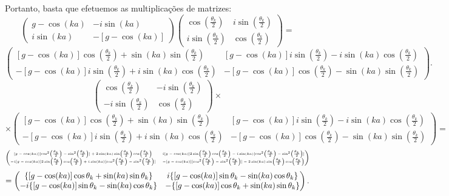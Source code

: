 \documentclass[a4paper,10pt]{article}
\begin{document}
Portanto, basta que efetuemos as multiplicações de matrizes:
$$
\begin{pmatrix}
g-\cos(ka) & -i\sin(ka) \\
i\sin(ka) & -[g-\cos(ka)]
\end{pmatrix}
\begin{pmatrix}
\cos(\frac{\theta_k}{2}) & i \sin(\frac{\theta_k}{2}) \\
i \sin(\frac{\theta_k}{2}) & \cos(\frac{\theta_k}{2})
\end{pmatrix}
=
$$
$$
\begin{pmatrix}
[g-\cos(ka)] \cos(\frac{\theta_k}{2}) + \sin(ka) \sin(\frac{\theta_k}{2}) &
[g-\cos(ka)] i \sin(\frac{\theta_k}{2}) - i \sin(ka) \cos(\frac{\theta_k}{2}) \\
-[g-\cos(ka)] i \sin(\frac{\theta_k}{2}) + i \sin(ka) \cos(\frac{\theta_k}{2}) &
-[g-\cos(ka)] \cos(\frac{\theta_k}{2}) - \sin(ka) \sin(\frac{\theta_k}{2})
\end{pmatrix}.
$$
$$
\begin{pmatrix}
\cos(\frac{\theta_k}{2}) & -i \sin(\frac{\theta_k}{2}) \\
-i \sin(\frac{\theta_k}{2}) & \cos(\frac{\theta_k}{2})
\end{pmatrix}
\times
$$
$$
\times
\begin{pmatrix}
[g-\cos(ka)] \cos(\frac{\theta_k}{2}) + \sin(ka) \sin(\frac{\theta_k}{2}) &
[g-\cos(ka)] i \sin(\frac{\theta_k}{2}) - i \sin(ka) \cos(\frac{\theta_k}{2}) \\
-[g-\cos(ka)] i \sin(\frac{\theta_k}{2}) + i \sin(ka) \cos(\frac{\theta_k}{2}) &
-[g-\cos(ka)] \cos(\frac{\theta_k}{2}) - \sin(ka) \sin(\frac{\theta_k}{2})
\end{pmatrix} =
$$
$$
\tiny{
\begin{pmatrix}
[g-\cos(ka)] [\cos[2](\frac{\theta_k}{2}) - \sin[2](\frac{\theta_k}{2})] +
2 \sin(ka) \sin(\frac{\theta_k}{2}) \cos(\frac{\theta_k}{2}) &
i [g-\cos(ka)] 2 \sin(\frac{\theta_k}{2}) \cos(\frac{\theta_k}{2}) - i \sin(ka) [\cos[2](\frac{\theta_k}{2}) - \sin[2](\frac{\theta_k}{2})] \\
- i [g-\cos(ka)] 2 \sin(\frac{\theta_k}{2}) \cos(\frac{\theta_k}{2}) + i \sin(ka) [\cos[2](\frac{\theta_k}{2}) - \sin[2](\frac{\theta_k}{2})] &
- [g-\cos(ka)] [\cos[2](\frac{\theta_k}{2}) - \sin[2](\frac{\theta_k}{2})] -
2 \sin(ka) \sin(\frac{\theta_k}{2}) \cos(\frac{\theta_k}{2})
\end{pmatrix} }
$$
$$
=
\begin{pmatrix}
\qty{[g-\cos(ka)] \cos\theta_k + \sin(ka) \sin\theta_k } &
 i \qty{[g-\cos(ka)] \sin\theta_k - \sin(ka) \cos\theta_k} \\
-i \qty{[g-\cos(ka)] \sin\theta_k - \sin(ka) \cos\theta_k} &
-\qty{[g-\cos(ka)] \cos\theta_k + \sin(ka) \sin\theta_k}
\end{pmatrix}.
$$
\end{document}

